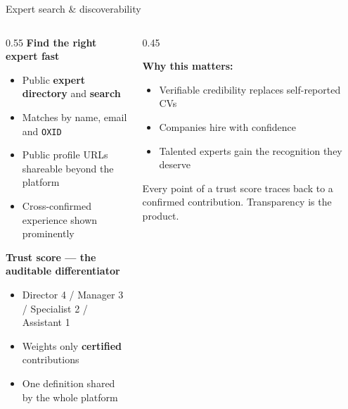 \documentclass[aspectratio=169, 10pt]{beamer}
\newcommand{\keypoint}[1]{%
  \begin{tcolorbox}[enhanced, colback=utlight, colframe=utteal,
    boxrule=0pt, leftrule=3pt, arc=2pt, boxsep=4pt, left=6pt, right=6pt, top=4pt, bottom=4pt]
    \color{utnavy}#1
  \end{tcolorbox}%
}
\begin{document}
\begin{frame}{Expert search \& discoverability}
  \begin{columns}[T]
    \begin{column}{0.55\textwidth}
      \textbf{Find the right expert fast}
      \begin{itemize}
        \item Public \textbf{expert directory} and \textbf{search}
        \item Matches by name, email and \texttt{OXID}
        \item Public profile URLs shareable beyond the platform
        \item Cross-confirmed experience shown prominently
      \end{itemize}
      \vspace{6pt}
      \textbf{Trust score --- the auditable differentiator}
      \begin{itemize}
        \item Director 4 / Manager 3 / Specialist 2 / Assistant 1
        \item Weights only \textbf{certified} contributions
        \item One definition shared by the whole platform
      \end{itemize}
    \end{column}
    \begin{column}{0.45\textwidth}
      \begin{tcolorbox}[enhanced, colback=utcream, colframe=utamber, boxrule=0pt, leftrule=3pt, arc=2pt, boxsep=8pt]
        {\color{utnavy}\textbf{Why this matters:}}\\[2pt]
        \begin{itemize}\small
          \item Verifiable credibility replaces self-reported CVs
          \item Companies hire with confidence
          \item Talented experts gain the recognition they deserve
        \end{itemize}
      \end{tcolorbox}
      \vspace{4pt}
      \keypoint{\small Every point of a trust score traces back to a confirmed contribution. Transparency is the product.}
    \end{column}
  \end{columns}
\end{frame}
\end{document}
